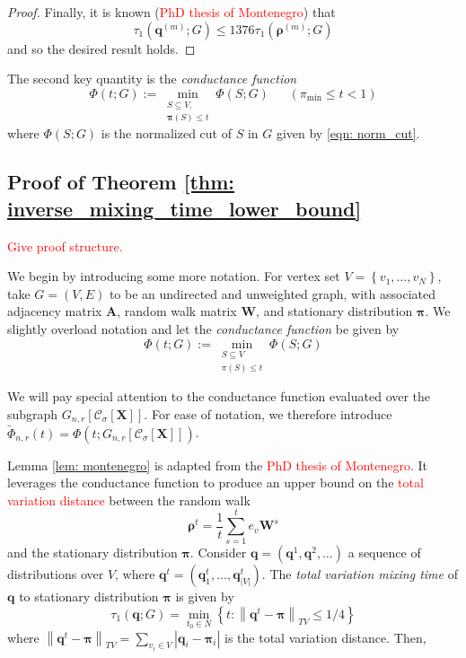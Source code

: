 \documentclass{article}
\newcommand{\set}[1]{\left\{#1\right\}}
\newcommand{\abs}[1]{\left \lvert #1 \right \rvert}
\newcommand{\norm}[1]{\left\lVert#1\right\rVert}
\newcommand{\1}{\mathbf{1}}
\newcommand{\qbf}{\mathbf{q}}
\newcommand{\pibf}{\bm{\pi}}
\newcommand{\rhobf}{\bm{\rho}}
\newcommand{\Abf}{\mathbf{A}}
\newcommand{\Xbf}{\mathbf{X}}
\newcommand{\Wbf}{\mathbf{W}}
\newcommand{\Cset}{\mathcal{C}}
\newcommand{\Csig}{\Cset_{\sigma}}
\theoremstyle{aldenthm}
\begin{document}
\begin{proof}
	Finally, it is known (\textcolor{red}{PhD thesis of Montenegro}) that
	\begin{equation*}
	\tau_{1}(\qbf^{(m)}; G) \leq 1376 \tau_{1}(\rhobf^{(m)}; G)
	\end{equation*}
	and so the desired result holds.
	
\end{proof}


The second key quantity is the \emph{conductance function}
\begin{equation*}
\Phi(t; G) := \min_{\substack{S \subseteq V, \\ \pibf(S) \leq t} } \Phi(S; G) ~~~~~~~ (\pi_{\min} \leq t < 1)
\end{equation*}
where $\Phi(S; G)$ is the normalized cut of $S$ in $G$ given by \eqref{eqn: norm_cut}.












\subsection{Proof of Theorem \ref{thm: inverse_mixing_time_lower_bound}}

\textcolor{red}{Give proof structure.}

We begin by introducing some more notation. For vertex set $V = \set{v_1, \ldots, v_N}$, take $G = (V,E)$ to be an undirected and unweighted graph, with associated adjacency matrix $\Abf$, random walk matrix $\Wbf$, and stationary distribution $\pibf$. We slightly overload notation and let the \emph{conductance function} be given by
\begin{equation*}
\Phi(t; G) := \min_{\substack{S \subseteq V \\ \pi(S) \leq t} } \Phi(S; G)
\end{equation*}

We will pay special attention to the conductance function evaluated over the subgraph $G_{n,r}[\Csig[\Xbf]]$. For ease of notation, we therefore introduce $\widetilde{\Phi}_{n,r}(t) = \Phi(t; G_{n,r}[\Csig[\Xbf]])$. 

Lemma \ref{lem: montenegro} is adapted from the \textcolor{red}{PhD thesis of Montenegro.} It leverages the conductance function to produce an upper bound on the \textcolor{red}{total variation distance} between the random walk 
\begin{equation}
\label{eqn: uniform_stopping_random_walk}
\rhobf^t = \frac{1}{t} \sum_{s = 1}^{t} e_v \Wbf^s
\end{equation}
and the stationary distribution $\pibf$. Consider $\qbf = (\qbf^1, \qbf^2, \ldots)$ a sequence of distributions over $V$, where $\qbf^t = (\qbf_1^t, \ldots, \qbf_{\abs{V}}^t)$. The \emph{total variation mixing time} of $\qbf$ to stationary distribution $\pibf$ is given by
\begin{equation*}
\tau_1(\qbf; G) = \min_{t_0 \in N} \set{t: \norm{\qbf^t - \pibf}_{TV} \leq 1/4}
\end{equation*}
where $\norm{\qbf^t - \pibf}_{TV} = \sum_{v_i \in V} \abs{\qbf_i - \pibf_i}$ is the total variation distance. Then,
\end{document}
